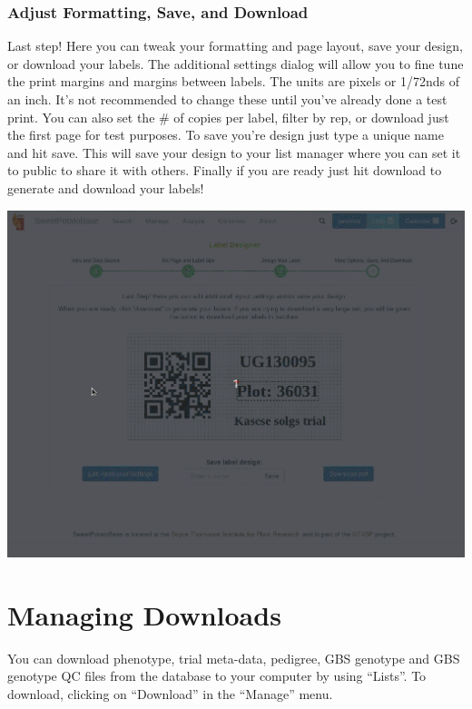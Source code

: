 \documentclass[
  12pt,
]{book}
\begin{document}
\hypertarget{adjust-formatting-save-and-download}{%
\subsection{Adjust Formatting, Save, and Download}\label{adjust-formatting-save-and-download}}

Last step! Here you can tweak your formatting and page layout, save your design, or download your labels. The additional settings dialog will allow you to fine tune the print margins and margins between labels. The units are pixels or 1/72nds of an inch. It's not recommended to change these until you've already done a test print. You can also set the \# of copies per label, filter by rep, or download just the first page for test purposes. To save you're design just type a unique name and hit save. This will save your design to your list manager where you can set it to public to share it with others. Finally if you are ready just hit download to generate and download your labels!

\begin{center}\includegraphics[width=0.95\linewidth]{assets/gifs/gif4} \end{center}

\hypertarget{managing-downloads}{%
\chapter{Managing Downloads}\label{managing-downloads}}

You can download phenotype, trial meta-data, pedigree, GBS genotype and GBS genotype QC files from the database to your computer by using ``Lists''. To download, clicking on ``Download'' in the ``Manage'' menu.
\end{document}
